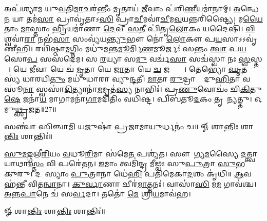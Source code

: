 𑌅𑌪॑𑌶𑍍𑌯𑌾𑌮 𑌯𑍁\ul{𑌵}𑌤𑌿\ul{𑌮𑌾}𑌚𑌰॑𑌨𑍍𑌤𑍀𑌂 \ul{𑌮𑍃}𑌤𑌾𑌯॑ \ul{𑌜𑍀}𑌵𑌾𑌂 𑌪॑𑌰𑌿\ul{𑌣𑍀}𑌯𑌮𑌾॑𑌨𑌾𑌮𑍍। 
\ul{𑌅}𑌨𑍍𑌧𑍇\ul{𑌨} 𑌯𑌾 𑌤𑌮॑\ul{𑌸𑌾} 𑌪𑍍𑌰𑌾𑌵𑍃॑𑌤𑌾𑌽\ul{𑌸𑌿} 𑌪𑍍𑌰𑌾\ul{𑌚𑍀}𑌮𑌵𑌾॑\ul{𑌚𑍀}𑌮\ul{𑌵}𑌯𑌨𑍍𑌨𑌰𑌿॑𑌷𑍍𑌟𑍍𑌯𑍈। 
𑌮\ul{𑌯𑍈}𑌤𑌾𑌂 \ul{𑌮𑌾}\ul{}𑌸𑍍𑌤𑌾𑌂 \ul{𑌭𑍍𑌰𑌿}𑌯𑌮𑌾॑𑌣𑌾 \ul{𑌦𑍇}𑌵𑍀 \ul{𑌸}𑌤𑍀 𑌪𑌿॑𑌤𑍃\ul{𑌲𑍋}𑌕𑌂 𑌯𑌦𑍈𑌷𑌿॑। 
\ul{𑌵𑌿}𑌶𑍍𑌵𑌵𑌾॑\ul{𑌰𑌾} 𑌨𑌭॑\ul{𑌸𑌾} 𑌸𑌂𑌵𑍍𑌯॑𑌯\ul{𑌨𑍍𑌤𑍍𑌯𑍁}𑌭𑍗 𑌨𑍋॑ \ul{𑌲𑍋}𑌕𑍗 𑌪\ul{𑌯}𑌸𑌾𑌽𑌽𑌵𑍃॑𑌣𑍀𑌹𑌿। 
𑌰𑌯𑌿॑𑌷𑍍𑌠𑌾\ul{𑌮}𑌗𑍍𑌨𑌿𑌂 𑌮𑌧𑍁॑𑌮𑌨𑍍𑌤\ul{𑌮𑍂}𑌰𑍍𑌮𑌿\ul{𑌣}𑌮𑍂𑌰𑍍𑌜𑌃॑ 𑌸𑌨𑍍𑌤𑌂 \ul{𑌤𑍍𑌵𑌾} 𑌪\ul{𑌯}𑌸𑍋\ul{𑌪} 𑌸𑌸॑𑌦𑍇𑌮। 
𑌸 \ul{𑌰}𑌯𑍍𑌯𑌾 𑌸\ul{𑌮𑍁} 𑌵𑌰𑍍𑌚॑\ul{𑌸𑌾} 𑌸𑌚॑𑌸𑍍𑌵𑌾 𑌨𑌃 \ul{𑌸𑍍𑌵}𑌸𑍍𑌤𑌯𑍇᳚। 
𑌯𑍇 \ul{𑌜𑍀}𑌵𑌾 𑌯𑍇 𑌚॑ \ul{𑌮𑍃}𑌤𑌾 𑌯𑍇 \ul{𑌜𑌾}𑌤𑌾 𑌯𑍇 \ul{𑌚} 𑌜𑌨𑍍𑌤𑍍𑌯𑌾𑌃᳚। 
𑌤𑍇𑌭𑍍𑌯𑍋॑ \ul{𑌘𑍃}𑌤𑌸𑍍𑌯॑ 𑌧𑌾𑌰𑌯𑌿\ul{𑌤𑍁𑌂} 𑌮𑌧𑍁॑𑌧𑌾𑌰𑌾 𑌵𑍍𑌯𑍁\ul{𑌨𑍍𑌦}𑌤𑍀। 
\ul{𑌮𑌾}𑌤𑌾 \ul{𑌰𑍁}𑌦𑍍𑌰𑌾𑌣𑌾𑌂᳚ 𑌦𑍁\ul{𑌹𑌿}𑌤𑌾 𑌵𑌸𑍂॑\ul{𑌨𑌾}\ul{} 𑌸𑍍𑌵𑌸𑌾॑\ul{𑌦𑌿}𑌤𑍍𑌯𑌾𑌨𑌾॑\ul{𑌮}𑌮𑍃𑌤॑\ul{𑌸𑍍𑌯} 𑌨𑌾𑌭𑌿𑌃॑। 
𑌪𑍍𑌰\ul{𑌣𑍁}𑌵𑍋𑌚𑌂॑ 𑌚𑌿\ul{𑌕𑌿}𑌤𑍁\ul{𑌷𑍇} 𑌜𑌨𑌾॑\ul{𑌯} 𑌮𑌾𑌗𑌾𑌮𑌨𑌾॑\ul{𑌗𑌾}𑌮𑌦𑌿॑𑌤𑌿𑌂 𑌵𑌧𑌿𑌷𑍍𑌟। 
𑌪𑌿𑌬॑𑌤𑍂\ul{𑌦}𑌕𑌂 𑌤𑍃𑌣𑌾᳚𑌨𑍍𑌯𑌤𑍍𑌤𑍁। 
𑌓𑌮𑍁\ul{𑌥𑍍𑌸𑍃}𑌜𑌤॥27॥
\anuvakamend[\ul{𑌵}\ul{𑌧𑌿}\ul{𑌷𑍍𑌟} 𑌦𑍍𑌵𑍇 𑌚॑]


𑌸𑌨𑍍𑌤𑍍𑌵𑌾॑ 𑌸𑌿𑌞𑍍𑌚𑌾\ul{𑌮𑌿} 𑌯𑌜𑍁𑌷𑌾॑ \ul{𑌪𑍍𑌰}𑌜𑌾𑌮𑌾\ul{𑌯𑍁}𑌰𑍍𑌧𑌨𑌂॑ 𑌚॥ 𑍐 𑌶𑌾\ul{𑌨𑍍𑌤𑌿𑌃} 𑌶𑌾\ul{𑌨𑍍𑌤𑌿𑌃} 𑌶𑌾𑌨𑍍𑌤𑌿𑌃॑॥

\ul{𑌸𑍁}\ul{𑌮}\ul{𑌙𑍍𑌗}𑌲𑍀\ul{𑌰𑌿}𑌯𑌂 \ul{𑌵}𑌧𑍂\ul{𑌰𑌿}𑌮𑌾 𑌸॑𑌮𑍇\ul{𑌤} 𑌪𑌶𑍍𑌯॑𑌤। 
𑌸𑍗𑌭𑌾᳚𑌗𑍍𑌯\ul{𑌮}𑌸𑍍𑌯𑍈 \ul{𑌦}𑌤𑍍𑌤𑍍𑌵𑌾𑌯𑌾𑌥𑌾\ul{𑌸𑍍𑌤𑌂} 𑌵𑌿 𑌪𑌰𑍇॑𑌤𑌨। 
\ul{𑌇}𑌮𑌾𑌂 𑌤𑍍𑌵𑌮𑌿॑𑌨𑍍𑌦𑍍𑌰 𑌮𑍀𑌢𑍍𑌵𑌃 𑌸𑍁\ul{𑌪𑍁}𑌤𑍍𑌰𑌾 \ul{𑌸𑍁}𑌭𑌗𑌾𑌂᳚ 𑌕𑍁𑌰𑍁। 
𑌦𑌶𑌾᳚𑌸𑍍𑌯𑌾𑌂 \ul{𑌪𑍁}𑌤𑍍𑌰𑌾𑌨𑌾 𑌧𑍇॑\ul{𑌹𑌿} 𑌪𑌤𑌿॑𑌮𑍇𑌕𑌾\ul{𑌦}𑌶𑌂 𑌕𑍃॑𑌧𑌿॥ \ul{𑌆}𑌵𑌹॑𑌨𑍍𑌤𑍀 𑌵𑌿𑌤\ul{𑌨𑍍𑌵𑌾}𑌨𑌾। 
\ul{𑌕𑍁}\ul{𑌰𑍍𑌵𑌾}𑌣𑌾 𑌚𑍀𑌰॑\ul{𑌮𑌾}𑌤𑍍𑌮𑌨𑌃॑। 
𑌵𑌾𑌸𑌾॑\ul{𑌸𑌿} 𑌮\ul{𑌮} 𑌗𑌾𑌵॑𑌶𑍍𑌚। 
\ul{𑌅}\ul{𑌨𑍍𑌨}\ul{𑌪𑌾}𑌨𑍇 𑌚॑ 𑌸\ul{𑌰𑍍𑌵}𑌦𑌾। 
𑌤𑌤𑍋॑ \ul{𑌮𑍇} 𑌶𑍍𑌰𑌿\ul{𑌯}𑌮𑌾𑌵॑𑌹।

𑍐 𑌶𑌾\ul{𑌨𑍍𑌤𑌿𑌃} 𑌶𑌾\ul{𑌨𑍍𑌤𑌿𑌃} 𑌶𑌾𑌨𑍍𑌤𑌿𑌃॑॥

\closesection
